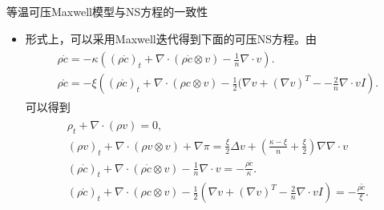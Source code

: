 \documentclass[mathserif]{beamer}
\begin{document}
\begin{frame}{等温可压Maxwell模型与NS方程的一致性}
\begin{itemize}
\item 形式上，可以采用Maxwell迭代得到下面的可压NS方程。由
\begin{eqnarray*}
\begin{smallmatrix}
			\rho \dot{c} = - \kappa \left( (\rho \dot{c})_t  + \nabla \cdot(\rho \dot{c} \otimes v) - \frac{1}{n} \nabla \cdot v  \right). \\
			\rho \mathring{c} = -\xi \left( (\rho \mathring{c})_t + \nabla \cdot (\rho c \otimes v) - \frac{1}{2} (\nabla v + (\nabla v)^T - - \frac{2}{n} \nabla \cdot v I \right).
\end{smallmatrix}
	\end{eqnarray*}
	可以得到
	\begin{subequations}%
		\begin{align*}
		\begin{smallmatrix}
			\rho_t + \nabla \cdot (\rho v) =0, \\
			(\rho v)_t + \nabla \cdot (\rho v \otimes v) + \nabla \pi = \frac{\xi}{2} \Delta v + (\frac{\kappa - \xi}{n} + \frac{\xi}{2}) \nabla \nabla \cdot  v \\ %
			(\rho \dot{c})_t  + \nabla \cdot(\rho \dot{c} \otimes v) -  \frac{1}{n} \nabla \cdot v = - \frac{\rho \dot{c}}{\kappa}. \\
			(\rho \mathring{c})_t + \nabla \cdot (\rho c \otimes v) - \frac{1}{2} (\nabla v + (\nabla v)^T - \frac{2}{n} \nabla \cdot v I) = - \frac{\rho \mathring{c}}{\xi}.
		\end{smallmatrix}
		\end{align*}
	\end{subequations}
\end{itemize}
\end{frame}
\end{document}
